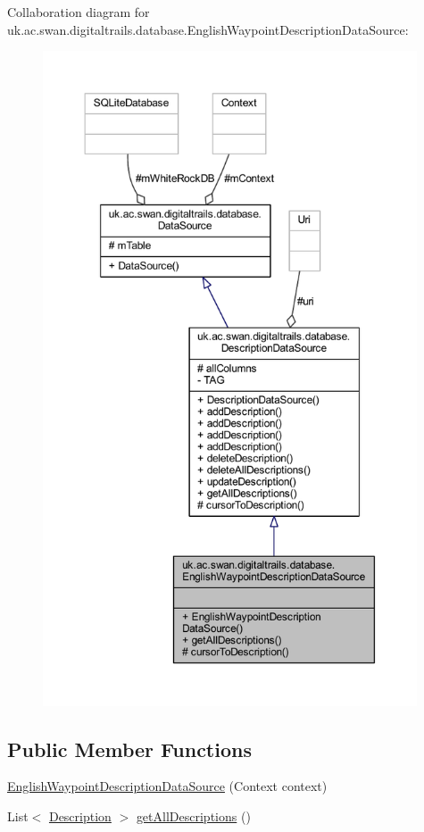 Collaboration diagram for uk.\+ac.\+swan.\+digitaltrails.\+database.\+English\+Waypoint\+Description\+Data\+Source\+:
\nopagebreak
\begin{figure}[H]
\begin{center}
\leavevmode
\includegraphics[height=550pt]{classuk_1_1ac_1_1swan_1_1digitaltrails_1_1database_1_1_english_waypoint_description_data_source__coll__graph}
\end{center}
\end{figure}
\subsection*{Public Member Functions}
\begin{DoxyCompactItemize}
\item 
\hyperlink{classuk_1_1ac_1_1swan_1_1digitaltrails_1_1database_1_1_english_waypoint_description_data_source_a554f6862ff0be09a2b0697d3c101a75a}{English\+Waypoint\+Description\+Data\+Source} (Context context)
\item 
List$<$ \hyperlink{classuk_1_1ac_1_1swan_1_1digitaltrails_1_1components_1_1_description}{Description} $>$ \hyperlink{classuk_1_1ac_1_1swan_1_1digitaltrails_1_1database_1_1_english_waypoint_description_data_source_a10a4b3c7c1904fd00a3314c2adffd647}{get\+All\+Descriptions} ()
\end{DoxyCompactItemize}
